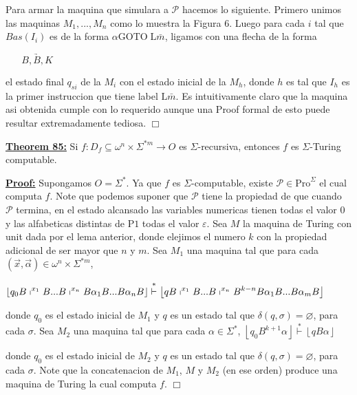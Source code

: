 Para armar la maquina que simulara a \(\mathcal{P}\) hacemos lo siguiente. Primero unimos las maquinas \(M_{1},...,M_{n}\) como lo muestra la Figura 6. Luego para cada \(i\) tal que \(Bas(I_{i})\) es de la forma \(\alpha \mathrm{GOTO} \;\mathrm{L}\bar{m}\), ligamos con una flecha de la forma

\(\displaystyle \underrightarrow{\;\;\;\;\;\;B,B,K\;\;\;\;\;\;} \)

el estado final \(q_{si}\) de la \(M_{i}\) con el estado inicial de la \(M_{h}\), donde \(h\) es tal que \(I_{h}\) es la primer instruccion que tiene label \( \mathrm{L}\bar{m}\).
Es intuitivamente claro que la maquina asi obtenida cumple con lo requerido aunque una Proof formal de esto puede resultar extremadamente tediosa. \(\Box\)

\textbf{\underline{Theorem 85:}} Si \(f:D_{f}\subseteq \omega ^{n}\times \Sigma ^{\ast m}\rightarrow O\) es \( \Sigma \)-recursiva, entonces \(f\) es \(\Sigma \)-Turing computable.

\textbf{\underline{Proof:}} Supongamos \(O=\Sigma ^{\ast }.\) Ya que \(f\) es \(\Sigma \)-computable, existe \( \mathcal{P}\in \mathrm{Pro}^{\Sigma }\) el cual computa \(f\). Note que podemos suponer que \(\mathcal{P}\) tiene la propiedad de que cuando \(\mathcal{P}\) termina, en el estado alcansado las variables numericas tienen todas el valor \(0\) y las alfabeticas distintas de \(\mathrm{P}1\) todas el valor \( \varepsilon \). Sea \(M\) la maquina de Turing con unit dada por el lema anterior, donde elejimos el numero \(k\) con la propiedad adicional de ser mayor que \(n\) y \(m\). Sea \(M_{1}\) una maquina tal que para cada \((\vec{x}, \vec{\alpha})\in \omega ^{n}\times \Sigma ^{\ast m}\),

\(\displaystyle \left\lfloor q_{0}B\shortmid ^{x_{1}}B...B\shortmid ^{x_{n}}B\alpha _{1}B...B\alpha _{n}B\right\rfloor \overset{\ast }{\vdash }\left\lfloor qB\shortmid ^{x_{1}}B...B\shortmid ^{x_{n}}B^{k-n}B\alpha _{1}B...B\alpha _{m}B\right\rfloor \)

donde \(q_{0}\) es el estado inicial de \(M_{1}\) y \(q\) es un estado tal que \( \delta (q,\sigma )=\varnothing \), para cada \(\sigma .\) Sea \(M_{2}\) una maquina tal que para cada \(\alpha \in \Sigma ^{\ast }\),
\(\displaystyle \left\lfloor q_{0}B^{k+1}\alpha \right\rfloor \overset{\ast }{\vdash } \left\lfloor qB\alpha \right\rfloor \)

donde \(q_{0}\) es el estado inicial de \(M_{2}\) y \(q\) es un estado tal que \( \delta (q,\sigma )=\varnothing \), para cada \(\sigma \). Note que la concatenacion de \(M_{1}\), \(M\) y \(M_{2}\) (en ese orden) produce una maquina de Turing la cual computa \(f\). \(\Box\)



